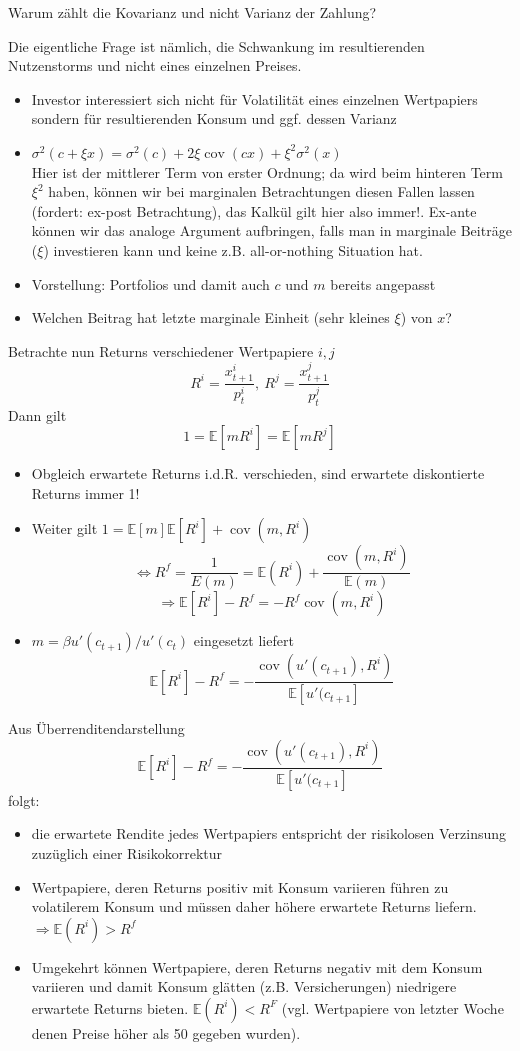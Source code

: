 \documentclass[12pt]{extreport} %
\theoremstyle{named}
\theoremstyle{nnamed}
\theoremstyle{itshape}
\theoremstyle{normal}
\begin{document}
Warum zählt die Kovarianz und nicht Varianz der Zahlung? \medskip

Die eigentliche Frage ist nämlich, die Schwankung im resultierenden Nutzenstorms und nicht eines einzelnen Preises.

\begin{itemize}
	\item Investor interessiert sich nicht für Volatilität eines einzelnen Wertpapiers sondern für resultierenden Konsum und ggf. dessen Varianz
	\item $\sigma^2(c + \xi x) = \sigma^2(c) + 2 \xi \operatorname{cov} (c x) + \xi^2 \sigma^2(x)$ ~\\
		Hier ist der mittlerer Term von erster Ordnung; da wird beim hinteren Term $\xi^2$ haben, können wir bei marginalen Betrachtungen diesen Fallen lassen (fordert: ex-post Betrachtung), das Kalkül gilt hier also immer!. Ex-ante können wir das analoge Argument aufbringen, falls man in marginale Beiträge ($\xi$) investieren kann und keine z.B. all-or-nothing Situation hat.
	\item Vorstellung: Portfolios und damit auch $c$ und $m$ bereits angepasst
	\item Welchen Beitrag hat letzte marginale Einheit (sehr kleines $\xi$) von $x$?
\end{itemize}

Betrachte nun Returns verschiedener Wertpapiere $i, j$
	$$ R^i = \frac{x_{t+1}^i}{p_t^i}, ~R^j = \frac{x_{t+1}^j}{p_t^j} $$
Dann gilt
$$ 1= \mathbb{E} \left[ m R^i \right] = \mathbb{E} \left[ m R^j \right] $$
\begin{itemize}
	\item Obgleich erwartete Returns i.d.R. verschieden, sind erwartete diskontierte Returns immer 1!
	\item Weiter gilt $1 = \mathbb{E}[m] \mathbb{E}[R^i] + \operatorname{cov}(m, R^i)$
		$$ \iff R^f = \frac{1}{E(m)} = \mathbb{E}(R^i) + \frac{\operatorname{cov}(m, R^i)}{\mathbb{E}(m)} $$
		$$ \Rightarrow \mathbb{E}[R^i] - R^f = - R^f \operatorname{cov}(m,R^i) $$ %
	\item $m = \beta u'(c_{t+1}) /u'(c_t)$ eingesetzt liefert
		$$ \mathbb{E}[R^i] - R^f = -\frac{\operatorname{cov}(u'(c_{t+1}), R^i)}{\mathbb{E}[u'(c_{t+1}]} $$
\end{itemize}

Aus Überrenditendarstellung
		$$ \mathbb{E}[R^i] - R^f = -\frac{\operatorname{cov}(u'(c_{t+1}), R^i)}{\mathbb{E}[u'(c_{t+1}]} $$
folgt:
\begin{itemize}
	\item die erwartete Rendite jedes Wertpapiers entspricht der risikolosen Verzinsung zuzüglich einer Risikokorrektur
	\item Wertpapiere, deren Returns positiv mit Konsum variieren führen zu volatilerem Konsum und müssen daher höhere erwartete Returns liefern. $\Rightarrow \mathbb{E}(R^i) > R^f$
	\item Umgekehrt können Wertpapiere, deren Returns negativ mit dem Konsum variieren und damit Konsum glätten (z.B. Versicherungen) niedrigere erwartete Returns bieten. $\mathbb{E}(R^i) < R^F$ (vgl. Wertpapiere von letzter Woche denen Preise höher als 50 gegeben wurden).
\end{itemize}
\end{document}
